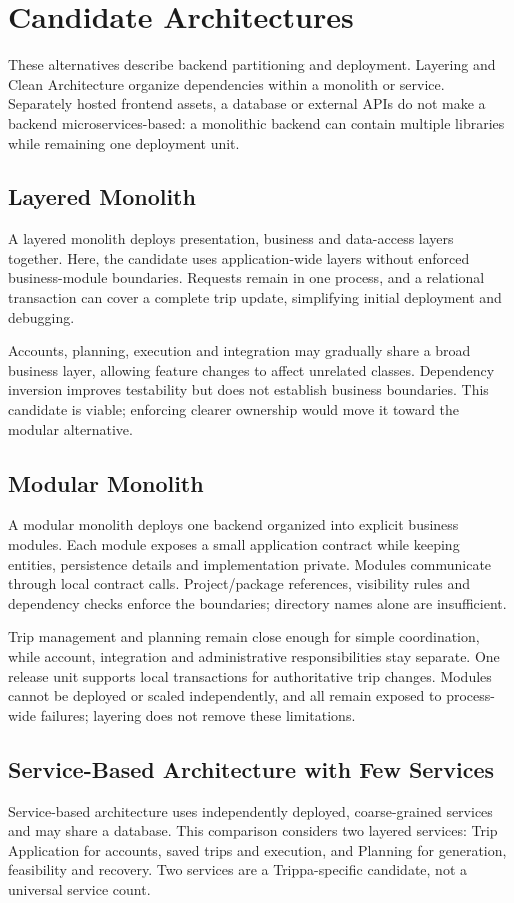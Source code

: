 \section{Candidate Architectures}
These alternatives describe backend partitioning and deployment. Layering and Clean Architecture organize dependencies within a monolith or service. Separately hosted frontend assets, a database or external APIs do not make a backend microservices-based: a monolithic backend can contain multiple libraries while remaining one deployment unit.

\subsection{Layered Monolith}
A layered monolith deploys presentation, business and data-access layers together. Here, the candidate uses application-wide layers without enforced business-module boundaries. Requests remain in one process, and a relational transaction can cover a complete trip update, simplifying initial deployment and debugging.

Accounts, planning, execution and integration may gradually share a broad business layer, allowing feature changes to affect unrelated classes. Dependency inversion improves testability but does not establish business boundaries. This candidate is viable; enforcing clearer ownership would move it toward the modular alternative.

\subsection{Modular Monolith}
A modular monolith deploys one backend organized into explicit business modules. Each module exposes a small application contract while keeping entities, persistence details and implementation private. Modules communicate through local contract calls. Project/package references, visibility rules and dependency checks enforce the boundaries; directory names alone are insufficient.

Trip management and planning remain close enough for simple coordination, while account, integration and administrative responsibilities stay separate. One release unit supports local transactions for authoritative trip changes. Modules cannot be deployed or scaled independently, and all remain exposed to process-wide failures; layering does not remove these limitations.

\subsection{Service-Based Architecture with Few Services}
Service-based architecture uses independently deployed, coarse-grained services and may share a database. This comparison considers two layered services: Trip Application for accounts, saved trips and execution, and Planning for generation, feasibility and recovery. Two services are a Trippa-specific candidate, not a universal service count.

